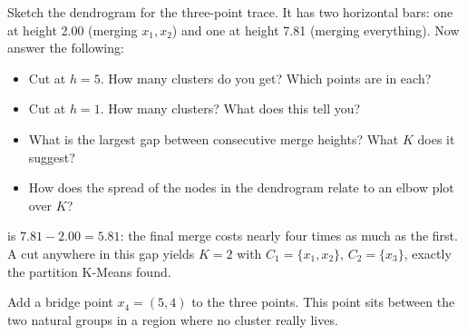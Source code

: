 
Sketch the dendrogram for the three-point trace.
It has two horizontal bars: one at height 2.00 (merging $x_1, x_2$) and one at height 7.81 (merging everything). Now answer the following:
\begin{itemize}
    \item Cut at $h{=}5$. How many clusters do you get? Which points are in each?
    \item Cut at $h{=}1$. How many clusters? What does this tell you?
    \item What is the largest gap between consecutive merge heights? What $K$ does it suggest?
    \item How does the spread of the nodes in the dendrogram relate to an elbow plot over $K$?
\end{itemize}

 is $7.81 - 2.00 = 5.81$: the final merge costs nearly four times as 
much as the first. A cut anywhere in this gap yields $K{=}2$ with $C_1{=}\{x_1,x_2\}$, $C_2{=}\{x_3\}$, exactly the partition K-Means found.





\vspace{2.5em}


Add a bridge point $x_4{=}(5,4)$ to the three points.
This point sits between the two natural groups in a region where no cluster really lives.

